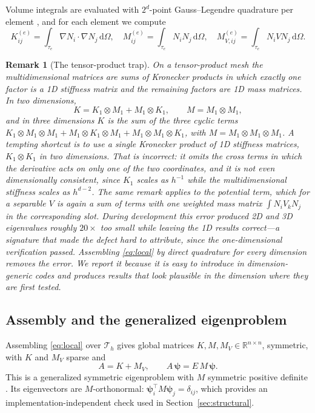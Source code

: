 \documentclass[pdflatex,sn-mathphys-num]{sn-jnl}
\theoremstyle{thmstyleone}%
\theoremstyle{thmstyletwo}%
\newtheorem{remark}{Remark}%
\theoremstyle{thmstylethree}%
\begin{document}
Volume integrals are evaluated with $2^d$-point Gauss--Legendre quadrature per
element \cite{strang1973}, and for each element we compute
%
\begin{equation}\label{eq:local}
  K^{(e)}_{ij} = \int_{\tau_e} \nabla N_i \cdot \nabla N_j \,\mathrm{d}\Omega,
  \quad
  M^{(e)}_{ij} = \int_{\tau_e} N_i N_j \,\mathrm{d}\Omega,
  \quad
  M^{(e)}_{V,ij} = \int_{\tau_e} N_i V N_j \,\mathrm{d}\Omega .
\end{equation}

\begin{remark}[The tensor-product trap]\label{rem:kron}
On a tensor-product mesh the multidimensional matrices are \emph{sums} of
Kronecker products in which exactly one factor is a 1D stiffness matrix and the
remaining factors are 1D mass matrices. In two dimensions,
%
\begin{equation}
  K = K_1 \otimes M_1 + M_1 \otimes K_1 ,
  \qquad
  M = M_1 \otimes M_1 ,
\end{equation}
%
and in three dimensions $K$ is the sum of the three cyclic terms
$K_1\otimes M_1\otimes M_1 + M_1\otimes K_1\otimes M_1 + M_1\otimes M_1\otimes K_1$,
with $M = M_1\otimes M_1\otimes M_1$. A tempting shortcut is to use a single
Kronecker product of 1D stiffness matrices, $K_1\otimes K_1$ in two dimensions.
That is \emph{incorrect}: it omits the cross terms in which the derivative acts
on only one of the two coordinates, and it is not even dimensionally consistent,
since $K_1$ scales as $h^{-1}$ while the multidimensional stiffness scales as
$h^{d-2}$. The same remark applies to the potential term, which for a separable
$V$ is again a sum of terms with one weighted mass matrix $\int N_i V_k N_j$ in
the corresponding slot. During development this error produced 2D and 3D eigenvalues
roughly $20\times$ too small while leaving the 1D results correct---a signature
that made the defect hard to attribute, since the one-dimensional verification
passed. Assembling \eqref{eq:local} by direct quadrature for every dimension
removes the error. We report it because it is easy to introduce in
dimension-generic codes and produces results that look plausible in the
dimension where they are first tested.
\end{remark}

\subsection{Assembly and the generalized eigenproblem}

Assembling \eqref{eq:local} over $\mathcal{T}_h$ gives global matrices
$K, M, M_V \in \mathbb{R}^{n\times n}$, symmetric, with $K$ and $M_V$ sparse and
%
\begin{equation}\label{eq:generalized}
  A = K + M_V ,
  \qquad
  A\,\boldsymbol{\psi} = E\,M\,\boldsymbol{\psi} .
\end{equation}
%
This is a generalized symmetric eigenproblem with $M$ symmetric positive
definite \cite{strang1973,saad2011}. Its eigenvectors are $M$-orthonormal:
$\boldsymbol{\psi}_i^\top M \boldsymbol{\psi}_j = \delta_{ij}$, which provides
an implementation-independent check used in Section~\ref{sec:structural}.
\end{document}
